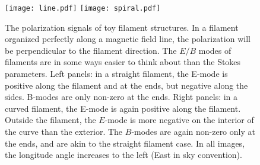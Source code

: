 \begin{figure}
  \texttt{[image: line.pdf]}
  \texttt{[image: spiral.pdf]}
  \caption{
    The polarization signals of toy filament structures.
    In a filament organized perfectly along a magnetic field line, the polarization will be perpendicular to the filament direction.  The $E/B$ modes of filaments are in some ways easier to think about than the Stokes parameters.
    Left panels: in a straight filament, the E-mode is positive along the filament and at the ends, but negative along the sides.  B-modes are only non-zero at the ends.  Right panels: in a curved filament, the E-mode is again positive along the filament.  Outside the filament, the $E$-mode is more negative on the interior of the curve than the exterior.  The $B$-modes are again non-zero only at the ends, and are akin to the straight filament case.
    In all images, the longitude angle increases to the left (East in sky convention).}
  \label{fig:polfilaments}
\end{figure}




 

